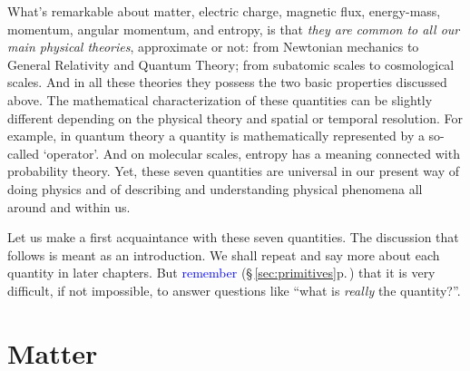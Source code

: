 \documentclass[a4paper,12pt,%
onecolumn,oneside,%
british%
]{memoir}
\providecommand{\href}[2]{#2}
\renewcommand*{\|}[1][]{\nonscript\:#1\vert\nonscript\:\mathopen{}}
\newcommand*{\sect}{\S}%
\newcommand*{\furl}[2]{\href{#1}{#2}\pagenote{\url{#1}}}
\renewcommand*{\autoref}[3][\sect\,\ref]{\textcolor{blue}{#3} {\color{blue}\scriptsize(\faIcon[regular]{eye}\;#1{#2}\;p.\,\pageref{#2})}}
\newcommand*{\energym}{energy-mass}
\begin{document}
\medskip

What's remarkable about matter, electric charge, magnetic flux, \energym, momentum, angular momentum, and entropy, is that \emph{they are common to all our main physical theories}, approximate or not: from Newtonian mechanics to General Relativity and Quantum Theory; from subatomic scales to cosmological scales. And in all these theories they possess the two basic properties discussed above. The mathematical characterization of these quantities can be slightly different depending on the physical theory and spatial or temporal resolution. For example, in quantum theory a quantity is mathematically represented by a so-called \enquote*{operator}. And on molecular scales, entropy has a meaning connected with probability theory. Yet, these seven quantities are universal in our present way of doing physics and of describing and understanding physical phenomena all around and within us.

%
%

Let us make a first acquaintance with these seven quantities. The discussion that follows is meant as an introduction. We shall repeat and say more about each quantity in later chapters.
But \autoref{sec:primitives}{remember} that it is very difficult, if not impossible, to answer questions like \enquote{what is \emph{really} the quantity\textellipsis?}.

\section{Matter}
\label{sec:intro_matter}
\end{document}
